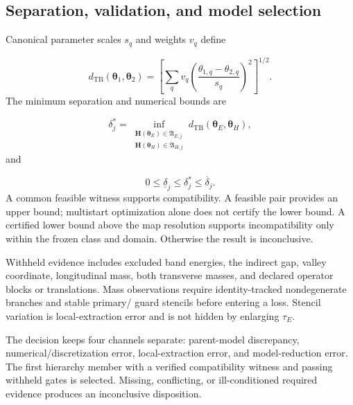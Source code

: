 \documentclass[11pt]{article}
\newenvironment{prospective}{\color{prospectivered}}{}
\begin{document}
\begin{prospective}
\subsection{Separation, validation, and model selection}
Canonical parameter scales $s_q$ and weights $v_q$ define

\begin{equation*}
d_{\mathrm{TB}}(\boldsymbol\theta_1,\boldsymbol\theta_2)
=
\left[
\sum_qv_q
\left(\frac{\theta_{1,q}-\theta_{2,q}}{s_q}\right)^2
\right]^{1/2}.
\tag{9}
\end{equation*}
The minimum separation and numerical bounds are

\begin{equation*}
\delta_j^\ast
=
\inf_{\substack{
\mathbf H(\boldsymbol\theta_E)\in\mathfrak A_{E,j}\\
\mathbf H(\boldsymbol\theta_H)\in\mathfrak A_{H,j}}}
 d_{\mathrm{TB}}(\boldsymbol\theta_E,\boldsymbol\theta_H),
\tag{10}
\end{equation*}
and

\begin{equation*}
0\leq\underline\delta_j\leq\delta_j^\ast\leq\overline\delta_j.
\tag{11}
\end{equation*}
A common feasible witness supports compatibility. A feasible pair provides an upper bound; multistart optimization alone does not certify the lower bound. A certified lower bound above the map resolution supports incompatibility only within the frozen class and domain. Otherwise the result is inconclusive.

Withheld evidence includes excluded band energies, the indirect gap, valley coordinate, longitudinal mass, both transverse masses, and declared operator blocks or translations. Mass observations require identity-tracked nondegenerate branches and stable primary/ guard stencils before entering a loss. Stencil variation is local-extraction error and is not hidden by enlarging $\tau_E$.

The decision keeps four channels separate: parent-model discrepancy, numerical/discretization error, local-extraction error, and model-reduction error. The first hierarchy member with a verified compatibility witness and passing withheld gates is selected. Missing, conflicting, or ill-conditioned required evidence produces an inconclusive disposition.

\end{prospective}
\end{document}
